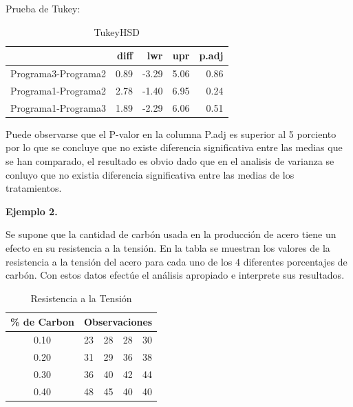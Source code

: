 \documentclass[12pt,letterpaper]{report}
\begin{document}
Prueba de Tukey: 
\begin{Schunk}
\end{Schunk}

\begin{table}[ht]
\centering
\begin{tabular}{rrrrr}
  \hline
 & diff & lwr & upr & p.adj \\ 
  \hline
Programa3-Programa2 & 0.89 & -3.29 & 5.06 & 0.86 \\ 
  Programa1-Programa2 & 2.78 & -1.40 & 6.95 & 0.24 \\ 
  Programa1-Programa3 & 1.89 & -2.29 & 6.06 & 0.51 \\ 
   \hline
\end{tabular}
\caption{TukeyHSD}
\end{table}

Puede observarse que el P-valor en la columna P.adj es superior al 5 porciento por lo que se concluye que no existe diferencia significativa entre las medias que se han comparado, el resultado es obvio dado que en el analisis de varianza se conluyo que no existia diferencia significativa entre las medias de los tratamientos.

\textbf{Ejemplo 2.}

Se supone que la cantidad de carbón usada en la producción de acero tiene un efecto en su
resistencia a la tensión. En la tabla se muestran los valores de la resistencia a la tensión del
acero para cada uno de los 4 diferentes porcentajes de carbón. Con estos datos efectúe el
análisis apropiado e interprete sus resultados.

\begin{table}[htb]
\centering
\begin{tabular}{||c|c|c|c|c||}
\hline
\hline
\% de Carbon  & \multicolumn{4}{c||}{Observaciones} \\
\hline
0.10 &23&28&28&30 \\
\hline
0.20 &31&29&36&38 \\
\hline
0.30 &36&40&42&44 \\
\hline
0.40 &48&45&40&40 \\
\hline
\hline

\end{tabular}
\caption{Resistencia a la Tensión}
\end{table}
\end{document}
